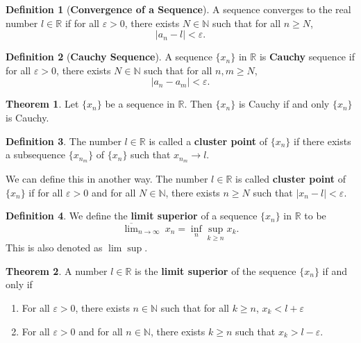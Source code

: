\documentclass[12pt]{article}
\newcommand{\R}{\mathbb{R}}
\newcommand{\N}{\mathbb{N}}
\renewcommand{\epsilon}{\varepsilon}
\theoremstyle{definition}
\newtheorem*{thm}{Theorem}
\newtheorem*{definition}{Definition}
\begin{document}
\begin{definition}[\textbf{Convergence of a Sequence}]

    A sequence converges to the real number \( l \in \R \) if for all \( \epsilon > 0 \), there exists \( N \in \N \) such that for all \( n \geq N \),
        \[
            |a_n - l| < \epsilon.  
        \]
    
\end{definition}

\begin{definition}[\textbf{Cauchy Sequence}]

    A sequence \( \{ x_n \} \) in \( \R \) is \textbf{Cauchy} sequence if for all \( \epsilon > 0 \), there exists \( N \in \N \) such that for all \( n, m \geq N \),
        \[
            | a_n - a_m| < \epsilon.  
        \]
    
\end{definition}

\begin{thm}
    Let \( \{x_n\} \) be a sequence in \( \R \). Then \( \{ x_n\} \) is Cauchy if and only \( \{ x_n \} \) is Cauchy.

\end{thm}

\begin{definition}
    The number \( l \in \R \) is called a \textbf{cluster point} of \(  \{x_n\} \) if there exists a subsequence \( \{ x_{n_{m}} \} \) of \( \{ x_n\} \) such that \( x_{n_{m}} \to l \).

    We can define this in another way. The number \( l \in \R \) is called \textbf{cluster point} of \( \{ x_n \} \) if for all \( \epsilon > 0 \) and for all \( N \in \N \), there exists \( n \geq N \) such that \( |x_n - l| < \epsilon \).
\end{definition}

\begin{definition}
    We define the \textbf{limit superior} of a sequence \( \{ x_n \} \) in \( \R \) to be 
        \[
            \overline{\lim}_{n \to \infty} \ x_n = \inf_{n} \sup_{k \geq n} x_k. 
        \]
    This is also denoted as \( \lim \sup \).
\end{definition}

\begin{thm}
    A number \( l \in \R \) is the \textbf{limit superior} of the sequence \( \{ x_n \} \) if and only if 
        \begin{enumerate}[label = (\roman{*})]
            \item For all \( \epsilon > 0 \), there exists \( n \in \N \) such that for all \( k \geq n\), \( x_k < l + \epsilon \)
            \item For all \( \epsilon > 0 \) and for all \( n \in \N \), there exists \( k \geq n \) such that \( x_{k} > l - \epsilon \). 
        \end{enumerate}
\end{thm}
\end{document}

